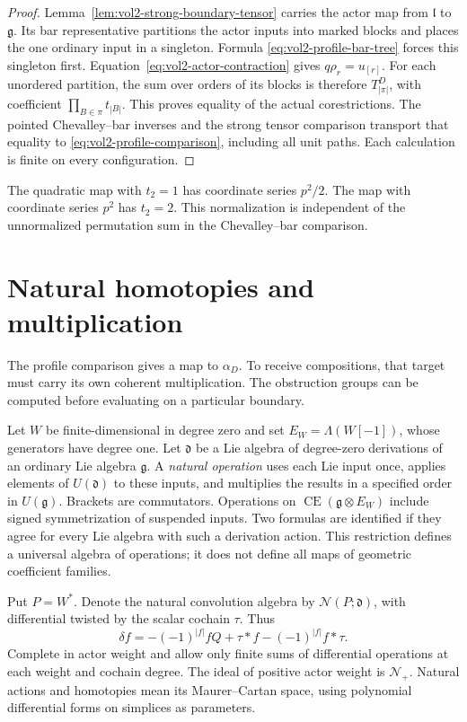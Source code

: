 \begin{proof}
Lemma~\ref{lem:vol2-strong-boundary-tensor} carries the actor map
from $\mathfrak l$ to $\mathfrak g$. Its bar representative
partitions the actor inputs into marked blocks and places the one
ordinary input in a singleton. Formula
\eqref{eq:vol2-profile-bar-tree} forces this singleton first.
Equation~\eqref{eq:vol2-actor-contraction} gives $q\rho_r=u_{[r]}$.
For each unordered partition, the sum over orders of its blocks
is therefore $T_{|\pi|}^D$, with coefficient
$\prod_{B\in\pi}t_{|B|}$. This proves equality of the actual
corestrictions. The pointed Chevalley--bar inverses and the strong
tensor comparison transport that equality to
\eqref{eq:vol2-profile-comparison}, including all unit paths.
Each calculation is finite on every configuration.
\end{proof}

The quadratic map with $t_2=1$ has coordinate series $p^2/2$.
The map with coordinate series $p^2$ has $t_2=2$. This normalization
is independent of the unnormalized permutation sum in the
Chevalley--bar comparison.

\section{Natural homotopies and multiplication}
\label{sec:vol2-natural-actions}

The profile comparison gives a map to $\alpha_D$. To receive
compositions, that target must carry its own coherent multiplication.
The obstruction groups can be computed before evaluating on a
particular boundary.

Let $W$ be finite-dimensional in degree zero and set
$E_W=\Lambda(W[-1])$, whose generators have degree one.
Let $\mathfrak d$ be a Lie algebra of degree-zero derivations of an
ordinary Lie algebra $\mathfrak g$. A \emph{natural operation} uses
each Lie input once, applies elements of $U(\mathfrak d)$ to these
inputs, and multiplies the results in a specified order in
$U(\mathfrak g)$. Brackets are commutators. Operations on
$\operatorname{CE}(\mathfrak g\otimes E_W)$ include signed
symmetrization of suspended inputs. Two formulas are identified if
they agree for every Lie algebra with such a derivation action.
This restriction defines a universal algebra of operations; it does
not define all maps of geometric coefficient families.

Put $P=W^*$. Denote the natural convolution algebra by
$\mathcal N(P;\mathfrak d)$, with differential twisted by the scalar
cochain $\tau$. Thus
\[
 \delta f=-(-1)^{|f|}fQ+\tau*f-(-1)^{|f|}f*\tau.
\]
Complete in actor weight and allow only finite sums of differential
operations at each weight and cochain degree. The ideal of positive
actor weight is $\mathcal N_+$. Natural actions and homotopies mean
its Maurer--Cartan space, using polynomial differential forms on
simplices as parameters.

